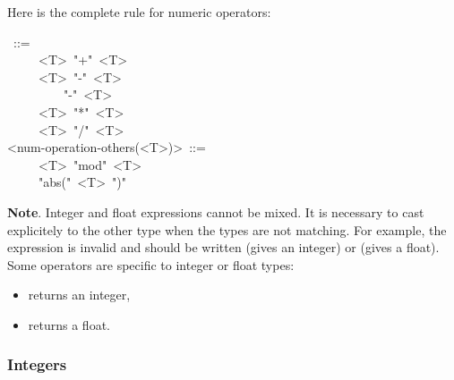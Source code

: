 \noindent Here is the complete rule for numeric operators:%
\begin{mdpre}%
~::=\\
~~~~\textbar{}~{\textless{}T\textgreater{}}~"+"~{\textless{}T\textgreater{}}\\
~~~~\textbar{}~{\textless{}T\textgreater{}}~"-"~{\textless{}T\textgreater{}}\\
~~~~\textbar{}~~~~~"-"~{\textless{}T\textgreater{}}\\
~~~~\textbar{}~{\textless{}T\textgreater{}}~"*"~{\textless{}T\textgreater{}}\\
~~~~\textbar{}~{\textless{}T\textgreater{}}~"/"~{\textless{}T\textgreater{}}\\
{\textless{}num-operation-others(\textless{}T\textgreater{})\textgreater{}}~::=\\
~~~~\textbar{}~{\textless{}T\textgreater{}}~"mod"~{\textless{}T\textgreater{}}\\
~~~~\textbar{}~"abs("~{\textless{}T\textgreater{}}~")"%
\end{mdpre}
\noindent\textbf{Note}.
Integer and float expressions cannot be mixed. It is necessary to cast
explicitely to the other type when the types are not matching. For
example, the expression  is invalid and should be written
 (gives an integer) or  (gives a float).
Some operators are specific to integer or float types:%

\begin{itemize}[noitemsep,topsep=\mdcompacttopsep]%

\item{} returns an integer,%

\item{} returns a float.%
\end{itemize}%

\subsubsection{Integers}\label{sec-integers}%

